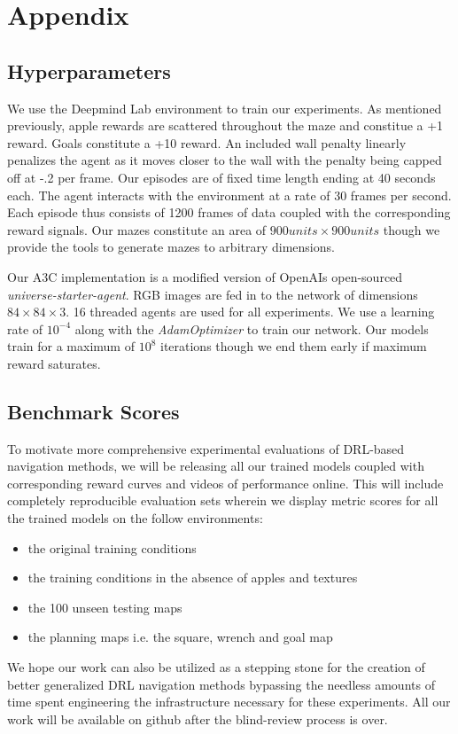 \section*{Appendix}

\subsection*{Hyperparameters}
We use the Deepmind Lab environment to train our experiments. 
As mentioned previously, apple rewards are scattered throughout the maze and constitue a +1 reward. 
Goals constitute a +10 reward. An included wall penalty linearly penalizes the agent as it moves closer to the wall with the penalty being capped off at -.2 per frame.
Our episodes are of fixed time length ending at 40 seconds each.
The agent interacts with the environment at a rate of 30 frames per second. 
Each episode thus consists of 1200 frames of data coupled with the corresponding reward signals.
Our mazes constitute an area of $900 units \times 900 units$ though we provide the tools to generate mazes to arbitrary dimensions. 

Our A3C implementation is a modified version of OpenAIs open-sourced \emph{universe-starter-agent}. RGB images are fed in to the network of dimensions $84\times84\times3$. 16 threaded agents are used for all experiments. We use a learning rate of $10^{-4}$ along with the \emph{AdamOptimizer} to train our network. Our models train for a maximum of $10^{8}$ iterations though we end them early if maximum reward saturates. 

\subsection*{Benchmark Scores}
To motivate more comprehensive experimental evaluations of DRL-based navigation methods, we will be releasing all our trained models coupled with corresponding reward curves and videos of performance online. 
This will include completely reproducible evaluation sets wherein we display metric scores for all the trained models on the follow environments:
\begin{itemize}
    \item the original training conditions
    \item the training conditions in the absence of apples and textures
    \item the 100 unseen testing maps
    \item the planning maps i.e. the square, wrench and goal map
\end{itemize}
We hope our work can also be utilized as a stepping stone for the creation of better generalized DRL navigation methods bypassing the needless amounts of time spent engineering the infrastructure necessary for these experiments. 
All our work will be available on github after the blind-review process is over.


